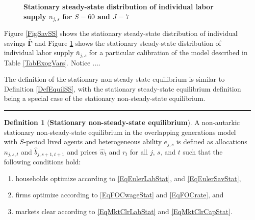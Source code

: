 \documentclass[letterpaper,12pt]{article}
\theoremstyle{definition}
\newtheorem{definition}{Definition} %
\begin{document}
\begin{spacing}{1.5}
    \begin{figure}[htb]\centering \captionsetup{width=4.0in}
      \caption{\label{FigLabSS}\textbf{Stationary steady-state distribution of individual labor supply $\bar{n}_{j,s}$ for $S=60$ and $J=7$}}
    \end{figure}

    Figure \ref{FigSavSS} shows the stationary steady-state distribution of individual savings $\bar{\bm{\Gamma}}$ and Figure \ref{FigLabSS} shows the stationary steady-state distribution of individual labor supply $\bar{n}_{j,s}$ for a particular calibration of the model described in Table \ref{TabExogVars}. Notice .... %

    The definition of the stationary non-steady-state equilibrium is similar to Definition \ref{DefEquilSS}, with the stationary steady-state equilibrium definition being a special case of the stationary non-steady-state equilibrium.

    \vspace{7mm}
    \end{spacing}
    \hrule
    \begin{definition}[\textbf{Stationary non-steady-state equilibrium}]\label{DefEquilNonSS}
      A non-autarkic stationary non-steady-state equilibrium in the overlapping generations model with $S$-period lived agents and heterogeneous ability $e_{j,s}$ is defined as allocations $n_{j,s,t}$ and $\hat{b}_{j,s+1,t+1}$ and prices $\hat{w}_t$ and $r_t$ for all $j$, $s$, and $t$ such that the following conditions hold:
       \begin{enumerate}
          \item households optimize according to \eqref{EqEulerLabStat}, and \eqref{EqEulerSavStat},
          \item firms optimize according to \eqref{EqFOCwageStat} and \eqref{EqFOCrate}, and
          \item markets clear according to \eqref{EqMktClrLabStat} and \eqref{EqMktClrCapStat}.
       \end{enumerate}
    \end{definition}
\end{document}
